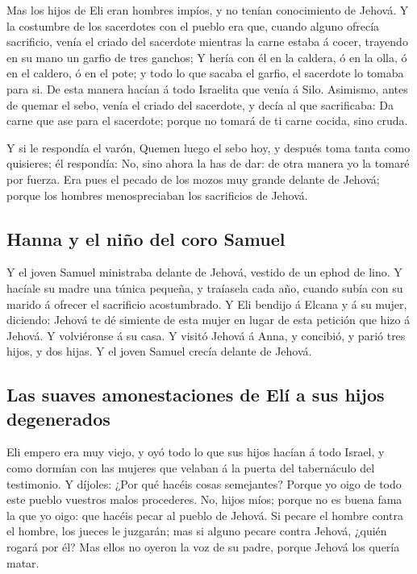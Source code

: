  Mas los hijos de Eli eran hombres impíos, y no tenían
conocimiento de Jehová.  Y la costumbre de los sacerdotes
con el pueblo era que, cuando alguno ofrecía sacrificio, venía el criado
del sacerdote mientras la carne estaba á cocer, trayendo en su mano un
garfio de tres ganchos;  Y hería con él en la caldera, ó en
la olla, ó en el caldero, ó en el pote; y todo lo que sacaba el garfio,
el sacerdote lo tomaba para si. De esta manera hacían á todo Israelita
que venía á Silo.  Asimismo, antes de quemar el sebo, venía
el criado del sacerdote, y decía al que sacrificaba: Da carne que ase
para el sacerdote; porque no tomará de ti carne cocida, sino cruda.

 Y si le respondía el varón, Quemen luego el sebo hoy, y
después toma tanta como quisieres; él respondía: No, sino ahora la has
de dar: de otra manera yo la tomaré por fuerza.  Era pues
el pecado de los mozos muy grande delante de Jehová; porque los hombres
menospreciaban los sacrificios de Jehová.

\hypertarget{hanna-y-el-niuxf1o-del-coro-samuel}{%
\subsection{Hanna y el niño del coro
Samuel}\label{hanna-y-el-niuxf1o-del-coro-samuel}}

 Y el joven Samuel ministraba delante de Jehová, vestido de
un ephod de lino.  Y hacíale su madre una túnica pequeña, y
traíasela cada año, cuando subía con su marido á ofrecer el sacrificio
acostumbrado.  Y Eli bendijo á Elcana y á su mujer,
diciendo: Jehová te dé simiente de esta mujer en lugar de esta petición
que hizo á Jehová. Y volviéronse á su casa.  Y visitó
Jehová á Anna, y concibió, y parió tres hijos, y dos hijas. Y el joven
Samuel crecía delante de Jehová.

\hypertarget{las-suaves-amonestaciones-de-eluxed-a-sus-hijos-degenerados}{%
\subsection{Las suaves amonestaciones de Elí a sus hijos
degenerados}\label{las-suaves-amonestaciones-de-eluxed-a-sus-hijos-degenerados}}

 Eli empero era muy viejo, y oyó todo lo que sus hijos
hacían á todo Israel, y como dormían con las mujeres que velaban á la
puerta del tabernáculo del testimonio.  Y díjoles: ¿Por qué
hacéis cosas semejantes? Porque yo oigo de todo este pueblo vuestros
malos procederes.  No, hijos míos; porque no es buena fama
la que yo oigo: que hacéis pecar al pueblo de Jehová.  Si
pecare el hombre contra el hombre, los jueces le juzgarán; mas si alguno
pecare contra Jehová, ¿quién rogará por él? Mas ellos no oyeron la voz
de su padre, porque Jehová los quería matar.

